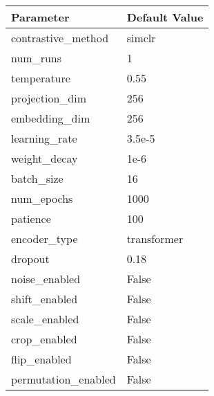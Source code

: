 \documentclass{article}
\begin{document}
\begin{longtable}{@{}ll@{}}
\toprule
\textbf{Parameter} & \textbf{Default Value} \\
\midrule
\endhead
\bottomrule
\endfoot
contrastive\_method & simclr \\
num\_runs & 1 \\
temperature & 0.55 \\
projection\_dim & 256 \\
embedding\_dim & 256 \\
learning\_rate & 3.5e-5 \\
weight\_decay & 1e-6 \\
batch\_size & 16 \\
num\_epochs & 1000 \\
patience & 100 \\
encoder\_type & transformer \\
dropout & 0.18 \\
noise\_enabled & False \\
shift\_enabled & False \\
scale\_enabled & False \\
crop\_enabled & False \\
flip\_enabled & False \\
permutation\_enabled & False \\
\end{longtable}
\end{document}
